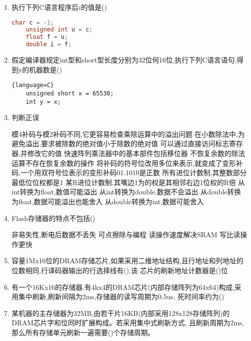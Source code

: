 \documentclass[12pt, a4paper, oneside, UTF8]{ctexbook}
\begin{document}
\begin{enumerate}
    \item 执行下列C语言程序后$i$的值是(\qquad)
    \begin{lstlisting}[language=C]
    char c = -1;
    unsigned int u = c;
    float f = u;
    double i = f;
    \end{lstlisting}

    \item 假定编译器规定int型和short型长度分别为32位何16位,执行下列C语言语句,得到y的机器数是(\qquad)
    \begin{lstlisting}{language=C}
    unsigned short x = 65530;
    int y = x;
    \end{lstlisting}

    \item 判断正误
    \begin{choices}[1]
        \task 模4补码与模2补码不同,它更容易检查乘除运算中的溢出问题
        \task 在小数除法中,为避免溢出,要求被除数的绝对值小于除数的绝对值
        \task 可以通过直接访问标志寄存器,并修改它的值
        \task 快速阵列乘法器中的基本部件包括移位器
        \task 不恢复余数的除法运算不存在恢复余数的操作
        \task 将补码的符号位改用多位来表示,就变成了变形补码,一个用双符号位表示的变形补码01.1010是正数
        \task 所有进位计数制,其整数部分最低位位权都是1
        \task 某R进位计数制,其嘴边1为的权是其相邻右边1位权的R倍
        \task 从int转换为float,数值可能溢出
        \task 从int转换为double,数据不会溢出
        \task 从double转换为float,数据可能溢出也能舍入
        \task 从double转换为int,数据可能舍入
    \end{choices}

    \item Flash存储器的特点不包括(\qquad)
    \begin{choices}[2]
        \task 非易失性,断电后数据不丢失 
        \task 可点擦除与编程
        \task 读操作速度解决SRAM
        \task 写比读操作更快
    \end{choices}

    \item 容量1Mx16位的DRAM存储芯片,如果采用二维地址结构,且行地址和列地址的位数相同,行译码器输出的行选择线有(\qquad),该
    芯片的刷新地址计数器是(\qquad)位

    \item 有一个16Kx16的存储器,有4kx4的DRAM芯片(内部存储阵列为64x64)构成,采用集中刷新,刷新间隔为2ms,存储器的读写周期为0.5us,
    死时间率约为(\qquad)

    \item 某机器的主存储器为32MB,由若干片16KB(内部采用128x128存储阵列)的DRAM芯片字和位同时扩展构成。若采用集中式刷新方式,
    且刷新周期为2ms,那么所有存储单元刷新一遍需要(\qquad)个存储周期。


\end{enumerate}
\end{document}
